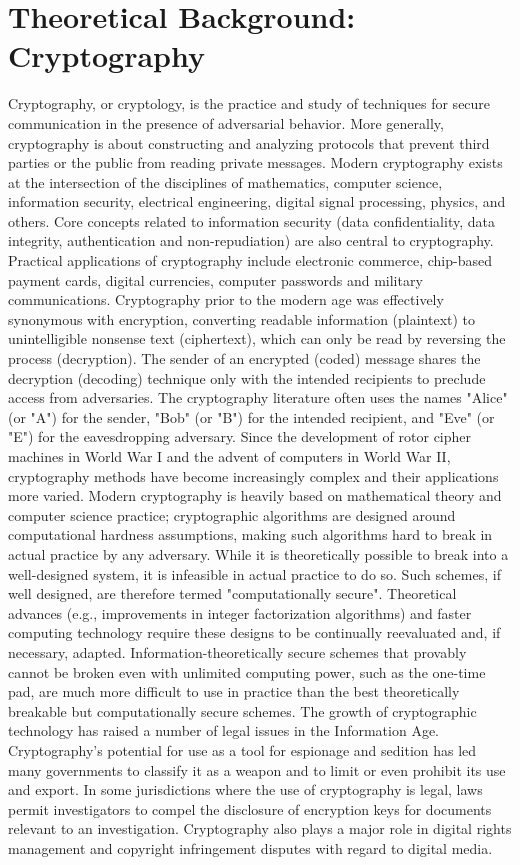 \documentclass[12pt,a4paper]{report}
\begin{document}
\section{Theoretical Background: Cryptography}
Cryptography, or cryptology, is the practice and study of techniques for secure communication in the presence of adversarial behavior. More generally, cryptography is about constructing and analyzing protocols that prevent third parties or the public from reading private messages. Modern cryptography exists at the intersection of the disciplines of mathematics, computer science, information security, electrical engineering, digital signal processing, physics, and others. Core concepts related to information security (data confidentiality, data integrity, authentication and non-repudiation) are also central to cryptography. Practical applications of cryptography include electronic commerce, chip-based payment cards, digital currencies, computer passwords and military communications.
Cryptography prior to the modern age was effectively synonymous with encryption, converting readable information (plaintext) to unintelligible nonsense text (ciphertext), which can only be read by reversing the process (decryption). The sender of an encrypted (coded) message shares the decryption (decoding) technique only with the intended recipients to preclude access from adversaries. The cryptography literature often uses the names "Alice" (or "A") for the sender, "Bob" (or "B") for the intended recipient, and "Eve" (or "E") for the eavesdropping adversary. Since the development of rotor cipher machines in World War I and the advent of computers in World War II, cryptography methods have become increasingly complex and their applications more varied.
Modern cryptography is heavily based on mathematical theory and computer science practice; cryptographic algorithms are designed around computational hardness assumptions, making such algorithms hard to break in actual practice by any adversary. While it is theoretically possible to break into a well-designed system, it is infeasible in actual practice to do so. Such schemes, if well designed, are therefore termed "computationally secure". Theoretical advances (e.g., improvements in integer factorization algorithms) and faster computing technology require these designs to be continually reevaluated and, if necessary, adapted. Information-theoretically secure schemes that provably cannot be broken even with unlimited computing power, such as the one-time pad, are much more difficult to use in practice than the best theoretically breakable but computationally secure schemes.
The growth of cryptographic technology has raised a number of legal issues in the Information Age. Cryptography's potential for use as a tool for espionage and sedition has led many governments to classify it as a weapon and to limit or even prohibit its use and export. In some jurisdictions where the use of cryptography is legal, laws permit investigators to compel the disclosure of encryption keys for documents relevant to an investigation. Cryptography also plays a major role in digital rights management and copyright infringement disputes with regard to digital media.
\end{document}
